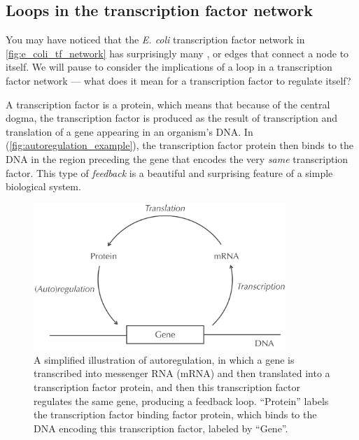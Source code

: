 \FloatBarrier
{}
\subsection{Loops in the transcription factor network}

You may have noticed that the \textit{E. coli} transcription factor network in \autoref{fig:e_coli_tf_network} has surprisingly many , or edges that connect a node to itself. We will pause to consider the implications of a loop in a transcription factor network --- what does it mean for a transcription factor to regulate itself?

A transcription factor is a protein, which means that because of the central dogma, the transcription factor is produced as the result of transcription and translation of a gene appearing in an organism's DNA. In  (\autoref{fig:autoregulation_example}), the transcription factor protein then binds to the DNA in the region preceding the gene that encodes the very \textit{same} transcription factor. This type of \textit{feedback} is a beautiful and surprising feature of a simple biological system.\\

\begin{figure}[h]
\centering
\mySfFamily
\includegraphics[width = 0.85\textwidth]{../images/autoregulation_example.png}
\caption{A simplified illustration of autoregulation, in which a gene is transcribed into messenger RNA (mRNA) and then translated into a transcription factor protein, and then this transcription factor regulates the same gene, producing a feedback loop. ``Protein'' labels the transcription factor binding factor protein, which binds to the DNA encoding this transcription factor, labeled by ``Gene''.}
\label{fig:autoregulation_example}
\end{figure}

